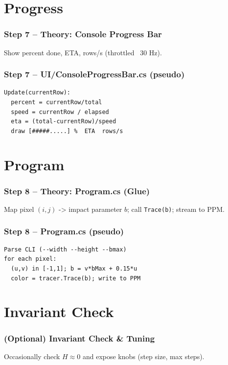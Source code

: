 \documentclass[aspectratio=169]{beamer}
\newcommand{\code}[1]{\texttt{#1}}
\newcommand{\ProgressStep}[1]{\progressstep{#1}}
\newcommand{\ThisFrameTitle}[1]{\frametitle{#1}}
\begin{document}
\section{Progress}
\begin{frame}
  \ProgressStep{7}\ThisFrameTitle{Step 7 -- Theory: Console Progress Bar}
  Show percent done, ETA, rows/s (throttled ~30 Hz).
\end{frame}

\begin{frame}[fragile]
  \ProgressStep{7}\ThisFrameTitle{Step 7 -- UI/ConsoleProgressBar.cs (pseudo)}
\begin{verbatim}
Update(currentRow):
  percent = currentRow/total
  speed = currentRow / elapsed
  eta = (total-currentRow)/speed
  draw [#####.....] %  ETA  rows/s
\end{verbatim}
\end{frame}

\section{Program}
\begin{frame}
  \ProgressStep{8}\ThisFrameTitle{Step 8 -- Theory: Program.cs (Glue)}
  Map pixel $(i,j)$ -> impact parameter $b$; call \code{Trace(b)}; stream to PPM.
\end{frame}

\begin{frame}[fragile]
  \ProgressStep{8}\ThisFrameTitle{Step 8 -- Program.cs (pseudo)}
\begin{verbatim}
Parse CLI (--width --height --bmax)
for each pixel:
  (u,v) in [-1,1]; b = v*bMax + 0.15*u
  color = tracer.Trace(b); write to PPM
\end{verbatim}
\end{frame}

\section{Invariant Check}
\begin{frame}
  \ProgressStep{-1}\ThisFrameTitle{(Optional) Invariant Check \& Tuning}
  Occasionally check $H \approx 0$ and expose knobs (step size, max steps).
\end{frame}
\end{document}
